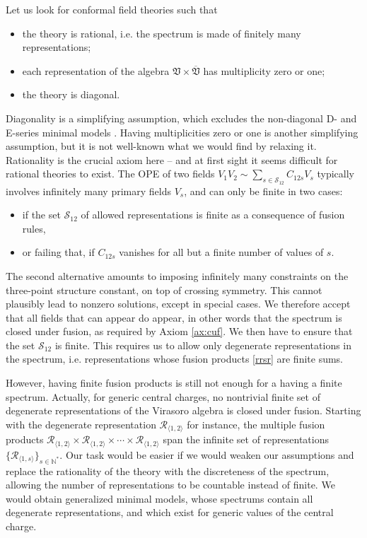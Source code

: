 \documentclass[12pt, a4paper, notitlepage, twoside]{report}
\numberwithin{equation}{section}
\theoremstyle{break}
\begin{document}
Let us look for conformal field theories such that
\begin{itemize}
\item the theory is rational, i.e.
the spectrum is made of finitely many representations;
\item each representation of the algebra $\mathfrak{V}\times \overline{\mathfrak{V}}$ has multiplicity zero or one;
\item the theory is diagonal.
\end{itemize}
Diagonality is a simplifying assumption, which excludes the non-diagonal D- and E-series minimal models \cite{fms97}.
Having multiplicities zero or one is another simplifying assumption, but it is not well-known what we would find by relaxing it. 
Rationality is the crucial axiom here -- and at first sight it seems difficult for rational theories to exist.
The OPE of two fields $V_1V_2\sim \sum_{s \in \mathcal{S}_{12}} C_{12s} V_s$ typically involves infinitely many primary fields $V_s$, and can only be finite in two cases:
\begin{itemize}
 \item if the set $\mathcal{S}_{12}$ of allowed representations is finite as a consequence of fusion rules,
 \item or failing that, if $C_{12s}$ vanishes for all but a finite number of values of $s$. 
\end{itemize}
The second alternative amounts to imposing infinitely many constraints on the three-point structure constant, on top of crossing symmetry. 
This cannot plausibly lead to nonzero solutions, except in special cases. 
We therefore accept that all fields that can appear do appear, in other words that the spectrum is closed under fusion, as required by Axiom \ref{ax:cuf}.
We then have to ensure that the set $\mathcal{S}_{12}$ is finite.
This requires us to allow
only degenerate representations in the spectrum, i.e. representations whose fusion products \eqref{rrsr} are finite sums. 

However, having finite fusion products is still not enough for a having a finite spectrum. 
Actually, for generic central charges, no nontrivial finite set of degenerate representations of the Virasoro algebra is closed under fusion.
Starting with the degenerate representation $\mathcal{R}_{\langle 1,2 \rangle}$ for instance, the multiple fusion products $\mathcal{R}_{\langle 1,2 \rangle}\times \mathcal{R}_{\langle 1,2 \rangle}\times \cdots \times \mathcal{R}_{\langle 1,2 \rangle}$ span the infinite set of representations $\{\mathcal{R}_{\langle 1,s \rangle}\}_{s\in{\mathbb{N}}^*}$.
Our task would be easier if we would weaken our assumptions and replace the rationality of the theory with the discreteness of the spectrum, allowing the number of representations to be countable instead of finite.
We would obtain generalized minimal models, whose spectrums contain all degenerate representations, and which exist for generic values of the central charge. 
\end{document}

